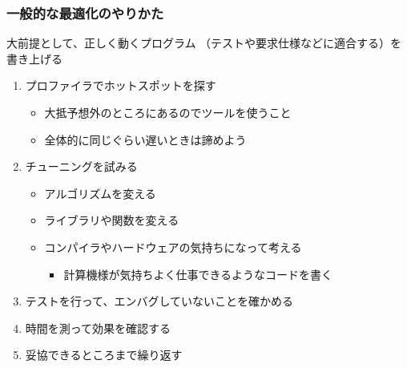 \begin{frame}
  \frametitle{一般的な最適化のやりかた}
    大前提として、正しく動くプログラム
      （テストや要求仕様などに適合する）を書き上げる
  \begin{enumerate}
     \item プロファイラでホットスポットを探す
      \begin{itemize}
        \item 大抵予想外のところにあるのでツールを使うこと
        \item 全体的に同じぐらい遅いときは諦めよう
      \end{itemize}
     \item チューニングを試みる
      \begin{itemize}
        \item アルゴリズムを変える
        \item ライブラリや関数を変える
        \item コンパイラやハードウェアの気持ちになって考える
          \begin{itemize}
            \item 計算機様が気持ちよく仕事できるようなコードを書く
          \end{itemize}
      \end{itemize}
     \item テストを行って、エンバグしていないことを確かめる
     \item 時間を測って効果を確認する
     \item 妥協できるところまで繰り返す
  \end{enumerate}
\end{frame}

